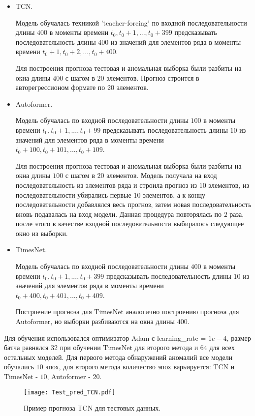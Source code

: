\documentclass{article}
\begin{document}
\begin{itemize}
\item TCN.

Модель обучалась техникой 'teacher-forcing' по входной последовательности длины $400$ в моменты времени $t_0, t_0 + 1, ..., t_0 + 399$ предсказывать последовательность длины $400$ из значений для элементов ряда в моменты времени $t_0 + 1, t_0 + 2, ..., t_0 + 400$.

Для построения прогноза тестовая и аномальная выборка были разбиты на окна длины $400$ с шагом в $20$ элементов. Прогноз строится в авторегрессионом формате по 20 элементов.

\item Autoformer.

Модель обучалась по входной последовательности длины $100$ в моменты времени $t_0, t_0 + 1, ..., t_0 + 99$ предсказывать последовательность длины $10$ из значений для элементов ряда в моменты времени $t_0 + 100, t_0 + 101, ..., t_0 + 109$.

Для построения прогноза тестовая и аномальная выборка были разбиты на окна длины $100$ с шагом в $20$ элементов. Модель получала на вход последовательность из элементов ряда и строила прогноз из $10$ элементов, из последовательности убирались первые $10$ элементов, а к концу последовательности добавлялся весь прогноз, затем новая последовательность вновь подавалась на вход модели. Данная процедура повторялась по $2$ раза, после этого в качестве входной последовательности выбиралось следующее окно из выборки.

\item TimesNet.

Модель обучалась по входной последовательности длины $400$ в моменты времени $t_0, t_0 + 1, ..., t_0 + 399$ предсказывать последовательность длины $10$ из значений для элементов ряда в моменты времени $t_0 + 400, t_0 + 401 , ..., t_0 + 409$.

Построение прогноза для TimesNet аналогично построению прогноза для Autoformer, но выборки разбиваются на окна длины $400$. 
\end{itemize}

Для обучения использовался оптимизатор Adam с learning\_rate = $1e-4$, размер батча равнялся $32$ при обучении TimesNet для второго метода и $64$ для всех остальных моделей. Для первого метода обнаружений аномалий все модели обучались $10$ эпох, для второго метода количество эпох варьируется: TCN и TimesNet - $10$, Autoformer - $20$.

\begin{figure}[H]
\centering
\texttt{[image: Test\_pred\_TCN.pdf]}
\caption{Пример прогноза TCN для тестовых данных.}
\label{Test_TCN}
\end{figure}
\end{document}
